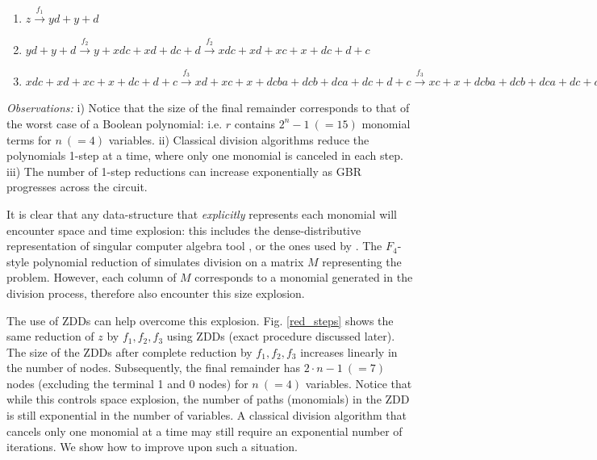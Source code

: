 \begin{enumerate}
\item { $z \xrightarrow{f_1} y d +y +d$}
\item { $y d +y +d \xrightarrow{f_2} y + xdc + xd + dc + d \xrightarrow{f_2} xdc + xd + xc + x +dc + d + c$}
\item { $xdc + xd + xc + x +dc + d + c \xrightarrow{f_3} xd + xc + x  +
  dcba  + dcb + dca + dc + d + c \xrightarrow{f_3} xc + x + dcba +dcb
  + dca + dc + dba + db + da + d + c \xrightarrow{f_3} x  +dcba +dcb +
  dca + dc + dba + db + da + d + cba + cb + ca + c \xrightarrow{f_3}
  dcba +dcb + dca + dc + dba + db + da + d + cba + cb + ca + c + ba +
  b +a=r$}
\end{enumerate}



{\it Observations:} i) Notice that the size of the final remainder 
corresponds to that of the worst case of a Boolean polynomial:
i.e. $r$ contains $2^n - 1\ (=15)$ monomial terms for $n\ (=4)$ variables. ii)
Classical division algorithms reduce the polynomials 1-step at a time,
where only one monomial is canceled in each step. iii) The number of
1-step reductions can increase exponentially as GBR progresses across
the circuit. 

It is clear that any data-structure that {\it explicitly} represents
each monomial will encounter space and time explosion: this includes
the dense-distributive representation of {\sc singular} computer
algebra tool \cite{DGPS}, or the ones used by
\cite{ciesielski:dac2015,rolf:date16}. The $F_4$-style
polynomial reduction of \cite{lv:tcad2013,pruss:tcad} simulates
division on a matrix $M$ representing the problem. However, each column
of $M$ corresponds to a monomial generated in the division process,
therefore \cite{lv:tcad2013,pruss:tcad} also encounter this size
explosion. 

The use of ZDDs can help overcome this explosion. Fig. \ref{red_steps} shows
the same reduction of $z$ by $f_1,f_2,f_3$ using ZDDs (exact
procedure discussed later). The size of the ZDDs after complete reduction by
$f_1,f_2,f_3$ increases linearly in the number of nodes. Subsequently,
the final remainder has $2\cdot n - 1\ (=7)$ nodes (excluding the
terminal 1 and 0 nodes) for $n\ (=4)$ variables. Notice that while
this controls space explosion, the number of paths (monomials) in the
ZDD is still exponential in the number of variables. A classical
division algorithm that cancels only one monomial at a time may still
require an exponential number of iterations. We show how to improve upon
such a situation. 

